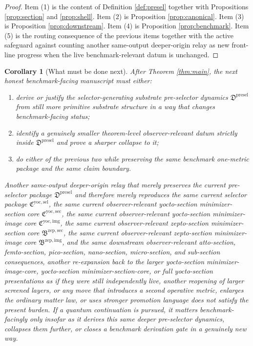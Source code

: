 \documentclass[11pt]{article}
\newcommand{\ZeptoImageCore}{\mathfrak B^{\mathrm{zep,img}}}
\newcommand{\ZeptoMinSectionCore}{\mathfrak B^{\mathrm{zep,sec}}}
\newcommand{\YoctoImageCore}{\mathfrak C^{\mathrm{yoc,img}}}
\newcommand{\YoctoMinSectionCore}{\mathfrak C^{\mathrm{yoc,sec}}}
\newcommand{\YoctoSelectorPackage}{\mathfrak C^{\mathrm{yoc,sel}}}
\newcommand{\PreSelectorPackage}{\mathfrak D^{\mathrm{presel}}}
\newtheorem{corollary}{Corollary}
\begin{document}
\begin{proof}
Item (1) is the content of Definition \ref{def:presel} together with Propositions \ref{prop:section} and \ref{prop:shell}. Item (2) is Proposition \ref{prop:canonical}. Item (3) is Proposition \ref{prop:downstream}. Item (4) is Proposition \ref{prop:benchmark}. Item (5) is the routing consequence of the previous items together with the active safeguard against counting another same-output deeper-origin relay as new front-line progress when the live benchmark-relevant datum is unchanged.
\end{proof}

\begin{corollary}[What must be done next]
\label{cor:next}
After Theorem \ref{thm:main}, the next honest benchmark-facing manuscript must either:
\begin{enumerate}
    \item derive or justify the selector-generating substrate pre-selector dynamics \(\PreSelectorPackage\) from still more primitive substrate structure in a way that changes benchmark-facing status;
    \item identify a genuinely smaller theorem-level observer-relevant datum strictly inside \(\PreSelectorPackage\) and prove a sharper collapse to it;
    \item do either of the previous two while preserving the same benchmark one-metric package and the same claim boundary.
\end{enumerate}
Another same-output deeper-origin relay that merely preserves the current pre-selector package \(\PreSelectorPackage\) and therefore merely reproduces the same current selector package \(\YoctoSelectorPackage\), the same current observer-relevant yocto-section minimizer-section core \(\YoctoMinSectionCore\), the same current observer-relevant yocto-section minimizer-image core \(\YoctoImageCore\), the same current observer-relevant zepto-section minimizer-section core \(\ZeptoMinSectionCore\), the same current observer-relevant zepto-section minimizer-image core \(\ZeptoImageCore\), and the same downstream observer-relevant atto-section, femto-section, pico-section, nano-section, micro-section, and sub-section consequences, another re-expansion back to the larger yocto-section minimizer-image-core, yocto-section minimizer-section-core, or full yocto-section presentations as if they were still independently live, another reopening of larger screened layers, or any move that introduces a second operative metric, enlarges the ordinary matter law, or uses stronger promotion language does not satisfy the present burden. If a quantum continuation is pursued, it matters benchmark-facingly only insofar as it derives this same deeper pre-selector dynamics, collapses them further, or closes a benchmark derivation gate in a genuinely new way.
\end{corollary}
\end{document}
